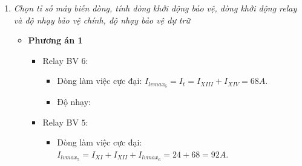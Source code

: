 \documentclass[12pt,a4paper]{article}
\begin{document}
\begin{enumerate}[1.]
\begin{enumerate}[\it a.]
				\item \emph{Chọn tỉ số máy biến dòng, tính dòng khởi động bảo vệ, dòng khởi động relay và độ nhạy bảo vệ chính, độ nhạy bảo vệ dự trữ}
					\begin{itemize}
						\item \textbf{Phương án 1}
							\begin{itemize}
								\item Relay BV $6$:
									\begin{itemize}
										\item Dòng làm việc cực đại: $I_{lvmax_{6}} = I_{t} = I_{XIII} + I_{XIV} = 68 \unit{A}$.
											
										\item Độ nhạy:
									\end{itemize}
									
									\item Relay BV $5$:
									\begin{itemize}
										\item Dòng làm việc cực đại: $I_{lvmax_{5}} = I_{XI} + I_{XII} + I_{lvmax_{6}} = 24 + 68 = 92 \unit{A}$.
\end{itemize}
\end{itemize}
\end{itemize}
\end{enumerate}
\end{enumerate}
\end{document}
